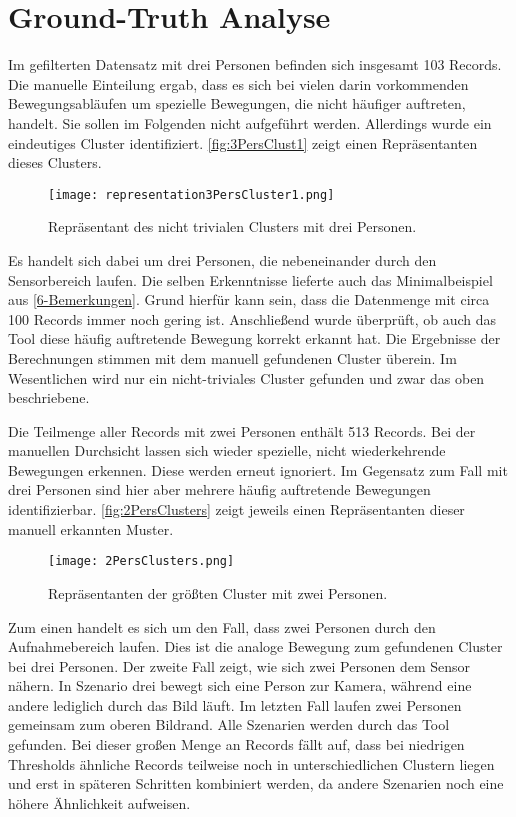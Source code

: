 \section{Ground-Truth Analyse}
\label{6-GroundTruth}
Im gefilterten Datensatz mit drei Personen befinden sich insgesamt 103 Records.
Die manuelle Einteilung ergab,
dass es sich bei vielen darin vorkommenden Bewegungsabläufen
um spezielle Bewegungen, die nicht häufiger auftreten, handelt.
Sie sollen im Folgenden nicht aufgeführt werden.
Allerdings wurde ein eindeutiges Cluster identifiziert.
\autoref{fig:3PersClust1} zeigt einen Repräsentanten dieses Clusters.
\begin{figure}[ht]
    \begin{center}
    \texttt{[image: representation3PersCluster1.png]}
    \end{center}
    \caption{Repräsentant des nicht trivialen Clusters mit drei Personen.}
    \label{fig:3PersClust1}
\end{figure}
Es handelt sich dabei um drei Personen, die nebeneinander durch den Sensorbereich laufen.
Die selben Erkenntnisse lieferte auch das Minimalbeispiel aus \autoref{6-Bemerkungen}.
Grund hierfür kann sein, dass die Datenmenge mit circa 100 Records immer noch gering ist.
Anschließend wurde überprüft, ob auch das Tool diese häufig auftretende Bewegung korrekt erkannt hat.
Die Ergebnisse der Berechnungen stimmen mit dem manuell gefundenen Cluster überein.
Im Wesentlichen wird nur ein nicht-triviales Cluster gefunden
und zwar das oben beschriebene.

Die Teilmenge aller Records mit zwei Personen enthält 513 Records.
Bei der manuellen Durchsicht lassen sich wieder spezielle,
nicht wiederkehrende Bewegungen erkennen.
Diese werden erneut ignoriert.
Im Gegensatz zum Fall mit drei Personen sind hier aber mehrere häufig auftretende Bewegungen identifizierbar.
\autoref{fig:2PersClusters} zeigt jeweils einen Repräsentanten dieser manuell erkannten Muster.
\begin{figure}[ht]
    \begin{center}
    \texttt{[image: 2PersClusters.png]}
    \end{center}
    \caption{Repräsentanten der größten Cluster mit zwei Personen.}
    \label{fig:2PersClusters}
\end{figure}
Zum einen handelt es sich um den Fall, dass zwei Personen durch den Aufnahmebereich laufen.
Dies ist die analoge Bewegung zum gefundenen Cluster bei drei Personen.
Der zweite Fall zeigt, wie sich zwei Personen dem Sensor nähern.
In Szenario drei bewegt sich eine Person zur Kamera,
während eine andere lediglich durch das Bild läuft.
Im letzten Fall laufen zwei Personen gemeinsam zum oberen Bildrand.
Alle Szenarien werden durch das Tool gefunden.
Bei dieser großen Menge an Records fällt auf,
dass bei niedrigen Thresholds ähnliche Records teilweise noch in unterschiedlichen Clustern liegen
und erst in späteren Schritten kombiniert werden,
da andere Szenarien noch eine höhere Ähnlichkeit aufweisen.

